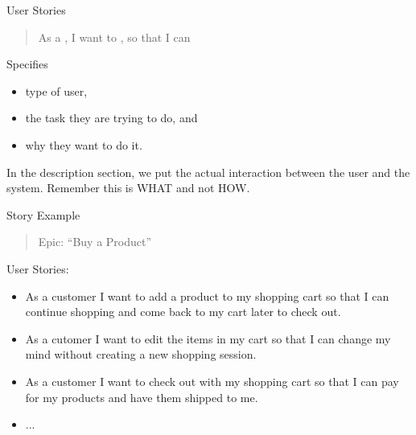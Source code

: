 \documentclass{beamer}
\begin{document}
\begin{frame}[fragile]{User Stories}



\begin{quote}
As a \hrulefill{}, I want to  \hrulefill{}, so that I can  \hrulefill{}
\end{quote}

Specifies
\begin{itemize}
\item type of user, 
\item the task they are trying to do, and 
\item why they want to do it.
\end{itemize}
In the description section, we put the actual interaction between the user and the system.  Remember this is WHAT and not HOW.

\end{frame}

\begin{frame}[fragile]{Story Example}

\begin{quote}
Epic: ``Buy a Product''
\end{quote}

User Stories:
\begin{itemize}
\item As a customer I want to add a product to my shopping cart so that I can continue shopping and come back to my cart later to check out.
\item As a cutomer I want to edit the items in my cart so that I can change my mind without creating a new shopping session.
\item As a customer I want to check out with my shopping cart so that I can pay for my products and have them shipped to me.
\item ...
\end{itemize}


\end{frame}



\end{document}
